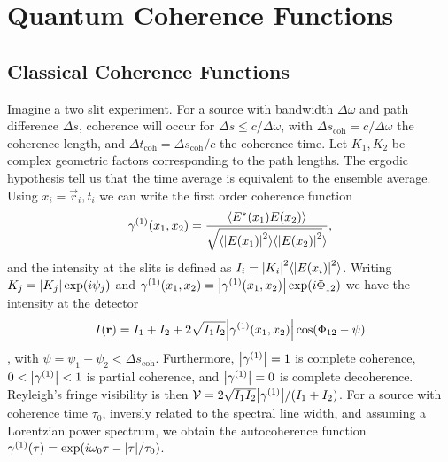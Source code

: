 \section{Quantum Coherence Functions}

\subsection{Classical Coherence Functions}
Imagine a two slit experiment. For a source with bandwidth $\Delta \omega$ and path difference $\Delta s$, coherence will occur for $\Delta s \leq c/\Delta \omega$, with $\Delta s_\text{coh} = c/\Delta\omega$ the coherence length, and $\Delta t_\text{coh} = \Delta s_\text{coh}/c$ the coherence time. Let $K_1,K_2$ be complex geometric factors corresponding to the path lengths. The ergodic hypothesis tell us that the time average is equivalent to the ensemble average. Using $x_i = \vec{r}_i, t_i$ we can write the first order coherence function
\begin{equation}
    \gamma^{(1)} (x_1, x_2) = \frac{\expval{E^*(x_1)E(x_2)}}{\sqrt{\langle\abs{E(x_1)}^2\rangle\langle\abs{E(x_2)}^2}\rangle},
\end{equation}
and the intensity at the slits is defined as $I_i = \abs{K_i}^2 \langle \abs{E(x_i)}^2 \rangle$. Writing $K_j = \abs{K_j}\exp(i\psi_j)$ and $\gamma^{(1)}(x_1,x_2) = \abs{\gamma^{(1)}(x_1,x_2)}\exp(i\Phi_{12})$ we have the intensity at the detector 
\begin{equation}
    I(\bm{\mathrm{r}}) = I_1 + I_2 +2\sqrt{I_1I_2}\abs{\gamma^{(1)}(x_1,x_2)}\cos(\Phi_{12} - \psi)
\end{equation}, with $\psi = \psi_1 - \psi_2 < \Delta s_\text{coh}$. Furthermore, $\abs{\gamma^{(1)}} = 1$ is complete coherence, $0 < \abs{\gamma^{(1)}} < 1$ is partial coherence, and $\abs{\gamma^{(1)}}=0$ is complete decoherence. Reyleigh's fringe visibility is then $\mathcal{V} = 2\sqrt{I_1I_2}\abs{\gamma^{(1)}}/(I_1 + I_2)$. For a source with coherence time $\tau_0$, inversly related to the spectral line width, and assuming a Lorentzian power spectrum, we obtain the autocoherence function $\gamma^{(1)}(\tau) = \exp(i\omega_0\tau - \abs{\tau}/\tau_0)$.  

